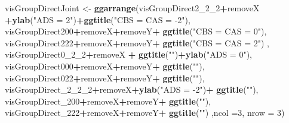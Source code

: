 \documentclass[10pt,dvipsnames,enabledeprecatedfontcommands]{scrartcl}
\newenvironment{Shaded}{\begin{snugshade}}{\end{snugshade}}
\newcommand{\KeywordTok}[1]{\textcolor[rgb]{0.13,0.29,0.53}{\textbf{#1}}}
\newcommand{\DataTypeTok}[1]{\textcolor[rgb]{0.13,0.29,0.53}{#1}}
\newcommand{\DecValTok}[1]{\textcolor[rgb]{0.00,0.00,0.81}{#1}}
\newcommand{\StringTok}[1]{\textcolor[rgb]{0.31,0.60,0.02}{#1}}
\newcommand{\OperatorTok}[1]{\textcolor[rgb]{0.81,0.36,0.00}{\textbf{#1}}}
\newcommand{\NormalTok}[1]{#1}
\begin{document}
\begin{Shaded}
\begin{Highlighting}[]
\NormalTok{visGroupDirectJoint <-}\StringTok{ }\KeywordTok{ggarrange}\NormalTok{(visGroupDirect2_}\DecValTok{2}\NormalTok{_}\DecValTok{2}\OperatorTok{+}\NormalTok{removeX }\OperatorTok{+}\KeywordTok{ylab}\NormalTok{(}\StringTok{"ADS = 2"}\NormalTok{)}\OperatorTok{+}\KeywordTok{ggtitle}\NormalTok{(}\StringTok{"CBS = CAS = -2"}\NormalTok{),}
\NormalTok{                                 visGroupDirect200}\OperatorTok{+}\NormalTok{removeX}\OperatorTok{+}\NormalTok{removeY}\OperatorTok{+}\StringTok{ }\KeywordTok{ggtitle}\NormalTok{(}\StringTok{"CBS = CAS = 0"}\NormalTok{),}
\NormalTok{                                 visGroupDirect222}\OperatorTok{+}\NormalTok{removeX}\OperatorTok{+}\NormalTok{removeY}\OperatorTok{+}\StringTok{ }\KeywordTok{ggtitle}\NormalTok{(}\StringTok{"CBS = CAS = 2"}\NormalTok{) ,}
\NormalTok{                        visGroupDirect0_}\DecValTok{2}\NormalTok{_}\DecValTok{2}\OperatorTok{+}\NormalTok{removeX }\OperatorTok{+}\StringTok{ }\KeywordTok{ggtitle}\NormalTok{(}\StringTok{""}\NormalTok{)}\OperatorTok{+}\KeywordTok{ylab}\NormalTok{(}\StringTok{"ADS = 0"}\NormalTok{),}
\NormalTok{                                visGroupDirect000}\OperatorTok{+}\NormalTok{removeX}\OperatorTok{+}\NormalTok{removeY}\OperatorTok{+}\StringTok{ }\KeywordTok{ggtitle}\NormalTok{(}\StringTok{""}\NormalTok{),}
\NormalTok{                                visGroupDirect022}\OperatorTok{+}\NormalTok{removeX}\OperatorTok{+}\NormalTok{removeY}\OperatorTok{+}\StringTok{ }\KeywordTok{ggtitle}\NormalTok{(}\StringTok{""}\NormalTok{),}
\NormalTok{                        visGroupDirect_}\DecValTok{2}\NormalTok{_}\DecValTok{2}\NormalTok{_}\DecValTok{2}\OperatorTok{+}\NormalTok{removeX}\OperatorTok{+}\KeywordTok{ylab}\NormalTok{(}\StringTok{"ADS = -2"}\NormalTok{)}\OperatorTok{+}\StringTok{ }\KeywordTok{ggtitle}\NormalTok{(}\StringTok{""}\NormalTok{),}
\NormalTok{                                  visGroupDirect_}\DecValTok{200}\OperatorTok{+}\NormalTok{removeX}\OperatorTok{+}\NormalTok{removeY}\OperatorTok{+}\StringTok{ }\KeywordTok{ggtitle}\NormalTok{(}\StringTok{""}\NormalTok{),}
\NormalTok{                        visGroupDirect_}\DecValTok{222}\OperatorTok{+}\NormalTok{removeX}\OperatorTok{+}\NormalTok{removeY}\OperatorTok{+}\StringTok{ }\KeywordTok{ggtitle}\NormalTok{(}\StringTok{""}\NormalTok{)}
\NormalTok{                                 ,}\DataTypeTok{ncol =}\DecValTok{3}\NormalTok{, }\DataTypeTok{nrow =} \DecValTok{3}\NormalTok{)}
                                  
      



\end{Highlighting}
\end{Shaded}
\end{document}
